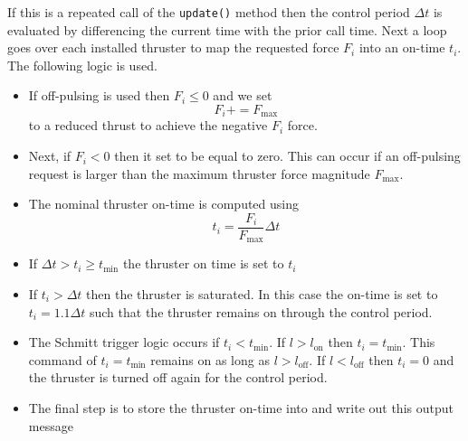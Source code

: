 If this is a repeated call of the {\tt update()} method then the control period $\Delta t$ is evaluated by differencing the current time with the prior call time.  Next a loop goes over each installed thruster to map the requested force $F_{i}$ into an on-time $t_{i}$.  The following logic is used.  
\begin{itemize}
	\item If off-pulsing is used then $F_{i}\le 0$ and we set $$F_{i} += F_{\text{max}}$$ to a reduced thrust to achieve the negative $F_{i}$ force.  
	\item Next, if $F_{i} < 0$ then it set to be equal to zero.  This can occur if an off-pulsing request is larger than the maximum thruster force magnitude $F_{\text{max}}$.  
	\item The nominal thruster on-time is computed using $$t_{i}  = \dfrac{F_{i}}{F_{\text{max}}} \Delta t$$ 
	\item If $\Delta t > t_{i} \ge t_{\text{min}}$ the thruster on time is set to $t_{i}$
	\item If $t_{i} > \Delta t$ then the thruster is saturated.   In this case the on-time is set to $t_{i} = 1.1\Delta t$ such that the thruster remains on through the control period.
	\item The Schmitt trigger logic occurs if $t_{i} < t_{\text{min}}$.  If $l>l_{\text{on}}$ then $t_{i} = t_{\text{min}}$.  This command of $t_{i} = t_{\text{min}}$ remains on as long as $l > l_{\text{off}}$.  If $l<l_{\text{off}}$ then $t_{i} = 0$ and the thruster is turned off again for the control period.
	\item The final step is to store the thruster on-time into  and write out this output message
\end{itemize}


